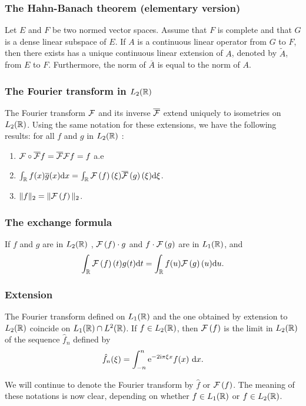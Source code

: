 \begin{frame}
\frametitle{The Hahn-Banach theorem (elementary version)}
\begin{theorem}
 Let $E$  and $F$ be two normed vector spaces. Assume that $F$ is complete and that $G$ is a dense linear subspace of $E$.
 If $A$ is a continuous linear operator from $G$ to $F$, then there exists has a unique continuous linear extension of $A$,  denoted by $\tilde{A}$, from $E$  to $F$. Furthermore, the norm of $\overline{A}$ is equal to the norm of $A$.
\end{theorem}
\end{frame}

\begin{frame}
\frametitle{The Fourier transform in $L_2(\mathbb{R})$}
\begin{theorem}
The Fourier transform $\mathcal{F}$ and its inverse $\overline{\mathcal{F}}$ extend uniquely to isometries on $L_2(\mathbb{R})$. Using the same notation for these extensions, we have the following results: for all $f$  and $g$ in $L_2(\mathbb{R})$ :
\begin{enumerate}[label=(\roman*)]
\item $\mathcal{F} \circ \overline{\mathcal{F}} f= \overline{\mathcal{F}} \mathcal{F} f = f$ a.e
\item $\int_{\mathbb{R}}f(x)\overline{g}(x) \mathrm{d} x=\int_{\mathbb{R}} \mathcal{F}\left( f \right)(\xi) \overline{\mathcal{F}}\left( g \right)(\xi)  \mathrm{d} \xi$.
\item  $\Vert f\Vert_{2}=\Vert \mathcal{F}\left( f \right) \Vert_{2}$.
\end{enumerate}
\end{theorem}
\end{frame}

\begin{frame}
\frametitle{The exchange formula}
\begin{theorem}
If $f$ and $g$  are in $L_2(\mathbb{R})$ , $\mathcal{F}\left( f \right) \cdot g$ and $f\cdot \mathcal{F}\left( g \right)$ are in $L_1(\mathbb{R})$, and
$$
\int_{\mathbb{R}} \mathcal{F}\left( f \right)(t)g(t) \mathrm{d} t=\int_{\mathbb{R}} f(u) \mathcal{F}\left( g \right)(u) \mathrm{d} u.
$$
\end{theorem}
\end{frame}

\begin{frame}
\frametitle{Extension}
\begin{theorem}
The Fourier transform defined on $L_1(\mathbb{R})$  and the one obtained by extension to $L_2(\mathbb{R})$  coincide on $L_1(\mathbb{R})\cap L^{2}(\mathbb{R})$. If $ f\in L_2(\mathbb{R})$,  then $\mathcal{F}\left( f \right)$  is the limit in $L_2(\mathbb{R})$  of the sequence $\hat{f}_{n}$ defined by
$$
\hat{f}_{n}(\xi)=\int_{-n}^{n} \mathrm{e}^{-2\mathrm{i} \pi\xi x}f(x)\ \mathrm{d} x.
$$
\end{theorem}
We will continue to denote the Fourier transform by $\hat{f}$ or $\mathcal{F}\left( f \right)$. The meaning of these notations is now clear, depending on whether $ f\in L_1(\mathbb{R})$ or $ f\in L_2(\mathbb{R})$.
\end{frame}

